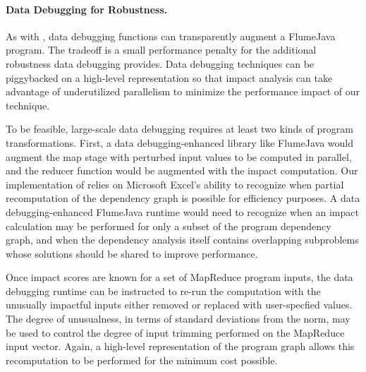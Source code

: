 \paragraph{Data Debugging for Robustness.}
As with \checkcell{}, data debugging functions can transparently
augment a FlumeJava program.  The tradeoff is a small performance
penalty for the additional robustness data debugging provides. Data
debugging techniques can be piggybacked on a high-level representation
so that impact analysis can take advantage of underutilized
parallelism to minimize the performance impact of our technique.

To be feasible, large-scale data debugging requires at least two kinds
of program transformations.  First, a data debugging-enhanced library
like FlumeJava would augment the map stage with perturbed input values
to be computed in parallel, and the reducer function would be
augmented with the impact computation.  Our implementation of
\checkcell{} relies on Microsoft Excel's ability to recognize when
partial recomputation of the dependency graph is possible for
efficiency purposes. A data debugging-enhanced FlumeJava runtime would
need to recognize when an impact calculation may be performed for
only a subset of the program dependency graph, and when the dependency
analysis itself contains overlapping subproblems whose solutions
should be shared to improve performance.

Once impact scores are known for a set of MapReduce program inputs,
the data debugging runtime can be instructed to re-run the computation
with the unusually impactful inputs either removed or replaced with
user-specfied values.  The degree of unusualness, in terms of standard
deviations from the norm, may be used to control the degree of
input trimming performed on the MapReduce input vector.  Again,
a high-level representation of the program graph allows this
recomputation to be performed for the minimum cost possible.
